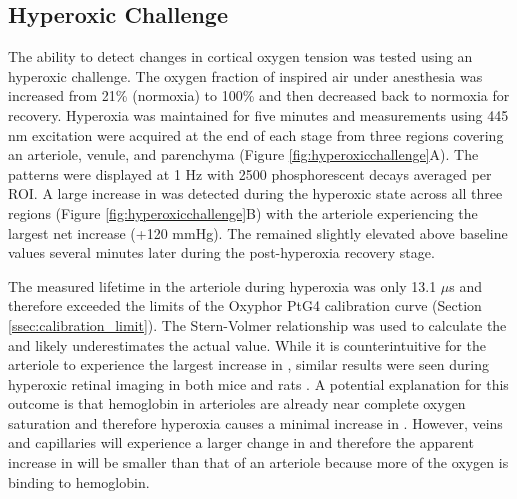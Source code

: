 \subsection{Hyperoxic Challenge}

The ability to detect changes in cortical oxygen tension was tested using an hyperoxic challenge. The oxygen fraction of inspired air under anesthesia was increased from 21\% (normoxia) to 100\% and then decreased back to normoxia for recovery. Hyperoxia was maintained for five minutes and  measurements using 445 nm excitation were acquired at the end of each stage from three regions covering an arteriole, venule, and parenchyma (Figure \ref{fig:hyperoxicchallenge}A). The patterns were displayed at 1 Hz with 2500 phosphorescent decays averaged per ROI. A large increase in  was detected during the hyperoxic state across all three regions (Figure \ref{fig:hyperoxicchallenge}B) with the arteriole experiencing the largest net increase (+120 mmHg). The  remained slightly elevated above baseline values several minutes later during the post-hyperoxia recovery stage.

The measured lifetime in the arteriole during hyperoxia was only 13.1 $\mu$s and therefore exceeded the limits of the Oxyphor PtG4 calibration curve (Section \ref{ssec:calibration_limit}). The Stern-Volmer relationship was used to calculate the  and likely underestimates the actual value. While it is counterintuitive for the arteriole to experience the largest increase in , similar results were seen during hyperoxic retinal imaging in both mice and rats \cite{Shonat:2003ia}. A potential explanation for this outcome is that hemoglobin in arterioles are already near complete oxygen saturation and therefore hyperoxia causes a minimal increase in . However, veins and capillaries will experience a larger change in  and therefore the apparent increase in  will be smaller than that of an arteriole because more of the oxygen is binding to hemoglobin.

